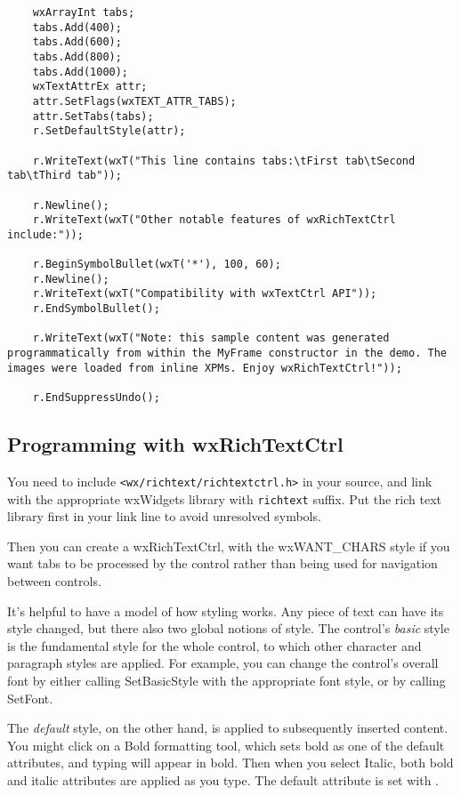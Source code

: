 {\begin{verbatim}
    wxArrayInt tabs;
    tabs.Add(400);
    tabs.Add(600);
    tabs.Add(800);
    tabs.Add(1000);
    wxTextAttrEx attr;
    attr.SetFlags(wxTEXT_ATTR_TABS);
    attr.SetTabs(tabs);
    r.SetDefaultStyle(attr);
    
    r.WriteText(wxT("This line contains tabs:\tFirst tab\tSecond tab\tThird tab"));

    r.Newline();
    r.WriteText(wxT("Other notable features of wxRichTextCtrl include:"));

    r.BeginSymbolBullet(wxT('*'), 100, 60);
    r.Newline();
    r.WriteText(wxT("Compatibility with wxTextCtrl API"));
    r.EndSymbolBullet();

    r.WriteText(wxT("Note: this sample content was generated programmatically from within the MyFrame constructor in the demo. The images were loaded from inline XPMs. Enjoy wxRichTextCtrl!"));

    r.EndSuppressUndo();
\end{verbatim}
}

\subsection{Programming with wxRichTextCtrl}

You need to include {\tt <wx/richtext/richtextctrl.h>} in your source, and link
with the appropriate wxWidgets library with {\tt richtext} suffix. Put the rich text
library first in your link line to avoid unresolved symbols.

Then you can create a wxRichTextCtrl, with the wxWANT\_CHARS style if you want tabs to
be processed by the control rather than being used for navigation between controls.

It's helpful to have a model of how styling works. Any piece of text can have its
style changed, but there also two global notions of style. The control's {\it basic} style
is the fundamental style for the whole control, to which other character and paragraph styles are
applied. For example, you can change the control's overall font by either calling SetBasicStyle with
the appropriate font style, or by calling SetFont.

The {\it default} style, on the other hand, is applied to subsequently inserted
content. You might click on a Bold formatting tool, which sets bold as one of the default
attributes, and typing will appear in bold. Then when you select Italic, both
bold and italic attributes are applied as you type. The default attribute
is set with .


